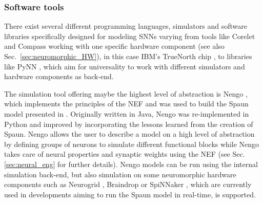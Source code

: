 \subsubsection{Software tools}

There exist several different programming languages, simulators and software libraries specifically designed for modeling \acp{SNN} varying from tools like Corelet \parencite{Amir2013} and Compass \parencite{Preissl2012} working with one specific hardware component (see also Sec.~\ref{sec:neuromorphic_HW}), in this case IBM's TrueNorth chip \parencite{Akopyan2015}, to libraries like \ac{PyNN} \parencite{Davison2008}, which aim for universality to work with different simulators and hardware components as back-end.

The simulation tool offering maybe the highest level of abstraction is \ac{Nengo} \parencites{Stewart2009, Bekolay2014}, which implements the principles of the \ac{NEF} \parencite{Eliasmith2003} and was used to build the \ac{Spaun} model presented in \textcite{Eliasmith2012}.
Originally written in Java, \ac{Nengo} was re-implemented in Python \parencite{Bekolay2014} and improved by incorporating the lessons learned from the creation of \ac{Spaun}.
\ac{Nengo} allows the user to describe a model on a high level of abstraction by defining groups of neurons to simulate different functional blocks while \ac{Nengo} takes care of neural properties and synaptic weights using the \ac{NEF} (see Sec. \ref{sec:neural_eng} for further details).
\ac{Nengo} models can be run using the internal simulation back-end, but also simulation on some neuromorphic hardware components such as Neurogrid \parencites{Dethier2011, Choudhary2012}, Braindrop \parencite{Neckar2019} or \ac{SpiNNaker} \parencite{Mundy2015}, which are currently used in developments aiming to run the \ac{Spaun} model in real-time, is supported.

